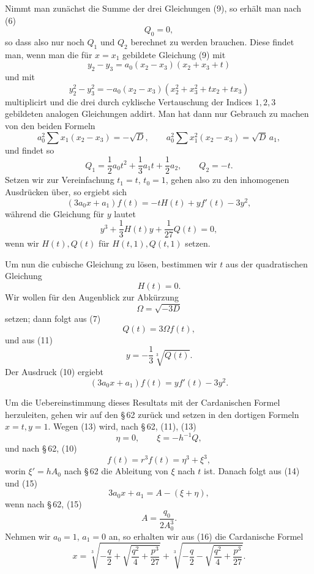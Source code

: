 \documentclass[11pt]{article}
\begin{document}
Nimmt man zunächst die Summe der drei Gleichungen (9), so erhält man nach (6)
\[
 Q_0=0,
\]
so dass also nur noch $Q_1$ und $Q_2$ berechnet zu werden brauchen. Diese findet man, wenn man die für $x=x_1$ gebildete Gleichung (9) mit
\[
 y_2-y_3=a_0(x_2-x_3)(x_2+x_3+t)
\]
und mit
\[
 y_2^2-y_3^2=-a_0(x_2-x_3)(x_2^2+x_3^2+tx_2+tx_3)
\]
multiplicirt und die drei durch cyklische Vertauschung der Indices $1,2,3$ gebildeten analogen Gleichungen addirt. Man hat dann nur Gebrauch zu machen von den beiden Formeln
\[
 a_0^2\sum x_1(x_2-x_3)=-\sqrt{D},
 \qquad
 a_0^2\sum x_1^2(x_2-x_3)=\sqrt{D}\,a_1,
\]
und findet so
\[
 Q_1=\frac12a_0t^2+\frac13a_1t+\frac12a_2,
 \qquad
 Q_2=-t.
\]
Setzen wir zur Vereinfachung $t_1=t$, $t_0=1$, gehen also zu den inhomogenen Ausdrücken über, so ergiebt sich
\begin{equation}
 (3a_0x+a_1)f(t)=-tH(t)+yf'(t)-3y^2,
\tag{10}
\end{equation}
während die Gleichung für $y$ lautet
\begin{equation}
 y^3+\frac13H(t)y+\frac1{27}Q(t)=0,
\tag{11}
\end{equation}
wenn wir $H(t),Q(t)$ für $H(t,1),Q(t,1)$ setzen.

Um nun die cubische Gleichung zu lösen, bestimmen wir $t$ aus der quadratischen Gleichung
\[
 H(t)=0.
\]
Wir wollen für den Augenblick zur Abkürzung
\begin{equation}
 \Omega=\sqrt{-3D}
\tag{12}
\end{equation}
setzen; dann folgt aus (7)
\begin{equation}
 Q(t)=3\Omega f(t),
\tag{13}
\end{equation}
und aus (11)
\begin{equation}
 y=-\frac13\sqrt[3]{Q(t)}.
\tag{14}
\end{equation}
Der Ausdruck (10) ergiebt
\begin{equation}
 (3a_0x+a_1)f(t)=yf'(t)-3y^2.
\tag{15}
\end{equation}

Um die Uebereinstimmung dieses Resultats mit der Cardanischen Formel herzuleiten, gehen wir auf den \S\,62 zurück und setzen in den dortigen Formeln $x=t,y=1$. Wegen (13) wird, nach \S\,62, (11), (13)
\[
 \eta=0,
 \qquad
 \xi=-h^{-1}Q,
\]
und nach \S\,62, (10)
\[
 f(t)=r^3f(t)=\eta^3+\xi^3,
\]
worin $\xi'=hA_0$ nach \S\,62 die Ableitung von $\xi$ nach $t$ ist. Danach folgt aus (14) und (15)
\begin{equation}
 3a_0x+a_1=A-(\xi+\eta),
\tag{16}
\end{equation}
wenn nach \S\,62, (15)
\[
 A=\frac{q_0}{2A_0^3}.
\]
Nehmen wir $a_0=1$, $a_1=0$ an, so erhalten wir aus (16) die Cardanische Formel
\begin{equation}
 x=\sqrt[3]{-\frac q2+\sqrt{\frac{q^2}{4}+\frac{p^3}{27}}}
  +\sqrt[3]{-\frac q2-\sqrt{\frac{q^2}{4}+\frac{p^3}{27}}}.
\tag{17}
\end{equation}
\end{document}
